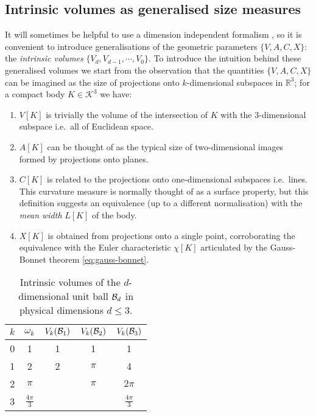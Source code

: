 \subsection{Intrinsic volumes as generalised size measures}

It will sometimes be helpful to use a dimension independent formalism%
,
so it is convenient to introduce generalisations of the geometric parameters $\{V,A,C,X\}$: the \emph{intrinsic volumes} $\{V_d, V_{d-1}, \cdots, V_0\}$.
To introduce the intuition behind these generalised volumes we start from the observation that the quantities $\{V,A,C,X\}$ can be imagined as the size of projections onto $k$-dimensional subspaces in $\mathbb{R}^3$; for a compact body $K \in \mathcal{K}^3$ we have:
\begin{enumerate}
\item $V[K]$ is trivially the volume of the intersection of $K$ with the 3-dimensional subspace i.e.\ all of Euclidean space.
\item $A[K]$ can be thought of as the typical size of two-dimensional images formed by projections onto planes.
\item $C[K]$ is related to the projections onto one-dimensional subspaces i.e.\ lines.
  This curvature measure is normally thought of as a surface property, but this definition suggests an equivalence (up to a different normalisation) with the \emph{mean width} $L[K]$ of the body.
\item $X[K]$ is obtained from projections onto a single point, corroborating the equivalence with the Euler characteristic $\chi[K]$ articulated by the Gauss-Bonnet theorem \eqref{eq:gauss-bonnet}.
\end{enumerate}

\begin{SCtable}
  \begin{minipage}[b]{\linewidth}
    \centering
    \begin{tabular}{ccccc}
      \toprule
      $k$ & $\omega_k$ & $V_k(\mathcal{B}_1)$ & $V_k(\mathcal{B}_2)$ & $V_k(\mathcal{B}_3)$ \\
      \midrule
      0 & 1 & 1 & 1 & 1 \\
      1 & 2 & 2 & $\pi$ & 4 \\
      2 & $\pi$ && $\pi$ & $2\pi$ \\
      3 & $\frac{4\pi}{3}$ &&& $\frac{4\pi}{3}$ \\
      \bottomrule
    \end{tabular}
  \end{minipage}
  \caption{Intrinsic volumes of the $d$-dimensional unit ball $\mathcal{B}_d$ in physical dimensions $d \le 3$.}
  \label{table:ball-intrinsic-volumes}
\end{SCtable}

